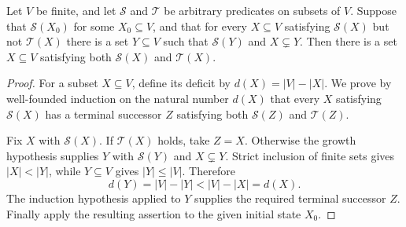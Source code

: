 \begin{lemma}
Let $V$ be finite, and let $\mathcal S$ and $\mathcal T$ be arbitrary
predicates on subsets of $V$.  Suppose that $\mathcal S(X_0)$ for some
$X_0\subseteq V$, and that for every $X\subseteq V$ satisfying
$\mathcal S(X)$ but not $\mathcal T(X)$ there is a set $Y\subseteq V$
such that $\mathcal S(Y)$ and $X\subsetneq Y$.  Then there is a set
$X\subseteq V$ satisfying both $\mathcal S(X)$ and $\mathcal T(X)$.
\end{lemma}
\begin{proof}
For a subset $X\subseteq V$, define its deficit by
$d(X)=|V|-|X|$.  We prove by well-founded induction on the natural number
$d(X)$ that every $X$ satisfying $\mathcal S(X)$ has a terminal successor
$Z$ satisfying both $\mathcal S(Z)$ and $\mathcal T(Z)$.

Fix $X$ with $\mathcal S(X)$.  If $\mathcal T(X)$ holds, take $Z=X$.
Otherwise the growth hypothesis supplies $Y$ with $\mathcal S(Y)$ and
$X\subsetneq Y$.  Strict inclusion of finite sets gives $|X|<|Y|$, while
$Y\subseteq V$ gives $|Y|\leq |V|$.  Therefore
\[
              d(Y)=|V|-|Y|<|V|-|X|=d(X).
\]
The induction hypothesis applied to $Y$ supplies the required terminal
successor $Z$.  Finally apply the resulting assertion to the given initial
state $X_0$.
\end{proof}
